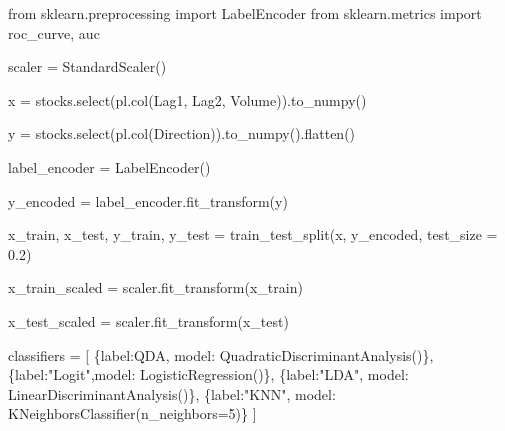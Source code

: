 \documentclass[
  letterpaper,
  DIV=11,
  numbers=noendperiod]{scrreprt}
\newenvironment{Shaded}{\begin{snugshade}}{\end{snugshade}}
\newcommand{\DecValTok}[1]{\textcolor[rgb]{0.68,0.00,0.00}{#1}}
\newcommand{\FloatTok}[1]{\textcolor[rgb]{0.68,0.00,0.00}{#1}}
\newcommand{\ImportTok}[1]{\textcolor[rgb]{0.00,0.46,0.62}{#1}}
\newcommand{\NormalTok}[1]{\textcolor[rgb]{0.00,0.23,0.31}{#1}}
\newcommand{\OperatorTok}[1]{\textcolor[rgb]{0.37,0.37,0.37}{#1}}
\newcommand{\StringTok}[1]{\textcolor[rgb]{0.13,0.47,0.30}{#1}}
\begin{document}
\begin{Shaded}
\begin{Highlighting}[]
\ImportTok{from}\NormalTok{ sklearn.preprocessing }\ImportTok{import}\NormalTok{ LabelEncoder}
\ImportTok{from}\NormalTok{ sklearn.metrics }\ImportTok{import}\NormalTok{ roc\_curve, auc}

\NormalTok{scaler }\OperatorTok{=}\NormalTok{ StandardScaler()}


\NormalTok{x }\OperatorTok{=}\NormalTok{ stocks.select(pl.col(}\StringTok{\textquotesingle{}Lag1\textquotesingle{}}\NormalTok{, }\StringTok{\textquotesingle{}Lag2\textquotesingle{}}\NormalTok{, }\StringTok{\textquotesingle{}Volume\textquotesingle{}}\NormalTok{)).to\_numpy()}

\NormalTok{y }\OperatorTok{=}\NormalTok{  stocks.select(pl.col(}\StringTok{\textquotesingle{}Direction\textquotesingle{}}\NormalTok{)).to\_numpy().flatten()}

\NormalTok{label\_encoder }\OperatorTok{=}\NormalTok{ LabelEncoder()}

\NormalTok{y\_encoded }\OperatorTok{=}\NormalTok{ label\_encoder.fit\_transform(y)}


\NormalTok{x\_train, x\_test, y\_train, y\_test }\OperatorTok{=}\NormalTok{ train\_test\_split(x,}
\NormalTok{                                                    y\_encoded,}
\NormalTok{                                                    test\_size }\OperatorTok{=} \FloatTok{0.2}\NormalTok{)}


\NormalTok{x\_train\_scaled }\OperatorTok{=}\NormalTok{ scaler.fit\_transform(x\_train)}

\NormalTok{x\_test\_scaled }\OperatorTok{=}\NormalTok{ scaler.fit\_transform(x\_test)}

\NormalTok{classifiers }\OperatorTok{=}\NormalTok{ [}
\NormalTok{    \{}\StringTok{\textquotesingle{}label\textquotesingle{}}\NormalTok{:}\StringTok{\textquotesingle{}QDA\textquotesingle{}}\NormalTok{,  }\StringTok{\textquotesingle{}model\textquotesingle{}}\NormalTok{: QuadraticDiscriminantAnalysis()\},}
\NormalTok{    \{}\StringTok{\textquotesingle{}label\textquotesingle{}}\NormalTok{:}\StringTok{"Logit"}\NormalTok{,}\StringTok{\textquotesingle{}model\textquotesingle{}}\NormalTok{: LogisticRegression()\},}
\NormalTok{    \{}\StringTok{\textquotesingle{}label\textquotesingle{}}\NormalTok{:}\StringTok{"LDA"}\NormalTok{,  }\StringTok{\textquotesingle{}model\textquotesingle{}}\NormalTok{: LinearDiscriminantAnalysis()\}, }
\NormalTok{    \{}\StringTok{\textquotesingle{}label\textquotesingle{}}\NormalTok{:}\StringTok{"KNN"}\NormalTok{,  }\StringTok{\textquotesingle{}model\textquotesingle{}}\NormalTok{: KNeighborsClassifier(n\_neighbors}\OperatorTok{=}\DecValTok{5}\NormalTok{)\}}
\NormalTok{]}



\end{Highlighting}
\end{Shaded}
\end{document}
